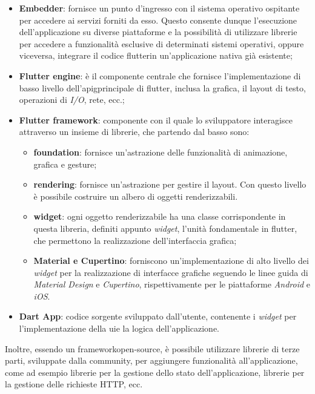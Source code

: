 \begin{itemize}
    \item \textbf{Embedder}: fornisce un punto d'ingresso con il sistema operativo ospitante per accedere ai servizi forniti da esso. Questo consente dunque l'esecuzione dell'applicazione su diverse piattaforme e la possibilità di utilizzare librerie per accedere a funzionalità esclusive di determinati sistemi operativi, oppure viceversa, integrare il codice \gls{flutter}\glsoccur in un'applicazione nativa già esistente;
    \item \textbf{Flutter engine}: è il componente centrale che fornisce l'implementazione di basso livello dell'\gls{apig}\glsoccur principale di \gls{flutter}\glsoccur, inclusa la grafica, il layout di testo, operazioni di \emph{I/O}, rete, ecc.;
    \item \textbf{Flutter framework}: componente con il quale lo sviluppatore interagisce attraverso un insieme di librerie, che partendo dal basso sono:
    \begin{itemize}
        \item \textbf{foundation}: fornisce un'astrazione delle funzionalità di animazione, grafica e \gls{gesture}\glsoccur;
        \item \textbf{rendering}: fornisce un'astrazione per gestire il layout. Con questo livello è possibile costruire un albero di oggetti renderizzabili.
        \item \textbf{widget}: ogni oggetto renderizzabile ha una classe corrispondente in questa libreria, definiti appunto \emph{widget}, l'unità fondamentale in \gls{flutter}\glsoccur, che permettono la realizzazione dell'interfaccia grafica;
        \item \textbf{Material e Cupertino}: forniscono un'implementazione di alto livello dei \emph{widget} per la realizzazione di interfacce grafiche seguendo le linee guida di \emph{Material Design} e \emph{Cupertino}, rispettivamente per le piattaforme \emph{Android} e \emph{iOS}.
    \end{itemize}
    \item \textbf{Dart App}: codice sorgente sviluppato dall'utente, contenente i \emph{widget} per l'implementazione della \gls{ui}\glsoccur e la logica dell'applicazione.
\end{itemize}

Inoltre, essendo un \gls{framework}\glsoccur \gls{open-source}\glsoccur, è possibile utilizzare librerie di terze parti, sviluppate dalla community, per aggiungere funzionalità all'applicazione, come ad esempio librerie per la gestione dello stato dell'applicazione, librerie per la gestione delle richieste HTTP, ecc. \\

